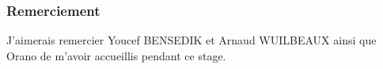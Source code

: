 

\begin{center}

    \subsubsection*{Remerciement}
J'aimerais remercier Youcef BENSEDIK et Arnaud WUILBEAUX ainsi que Orano  de m'avoir accueillis pendant ce stage. 
\end{center}


\begin{abstract}
    \lipsum[1]
\end{abstract}
    

\begin{adjustwidth}{30pt}{30pt}
\end{adjustwidth}

\tableofcontents
\listoffigures
\clearpage